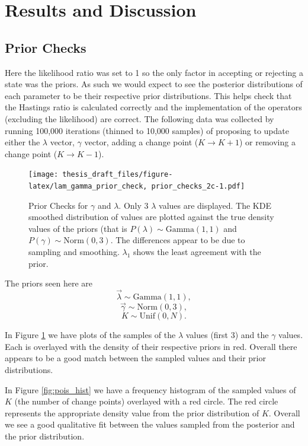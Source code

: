 \documentclass[11pt,a4paper]{article}
\begin{document}
\hypertarget{results-and-discussion}{%
\section{Results and Discussion}\label{results-and-discussion}}

\hypertarget{prior-checks-1}{%
\subsection{Prior Checks}\label{prior-checks-1}}

Here the likelihood ratio was set to 1 so the only factor in accepting
or rejecting a state was the priors. As such we would expect to see the
posterior distributions of each parameter to be their respective prior
distributions. This helps check that the Hastings ratio is calculated
correctly and the implementation of the operators (excluding the
likelihood) are correct. The following data was collected by running
100,000 iterations (thinned to 10,000 samples) of proposing to update
either the \(\lambda\) vector, \(\gamma\) vector, adding a change point
(\(K \rightarrow K + 1\)) or removing a change point
(\(K \rightarrow K - 1\)).

\begin{figure}
\centering
\texttt{[image: thesis\_draft\_files/figure-latex/lam\_gamma\_prior\_check, prior\_checks\_2c-1.pdf]}
\caption{\label{fig:pc2c} Prior Checks for \(\gamma\) and \(\lambda\).
Only 3 \(\lambda\) values are displayed. The KDE smoothed distribution
of values are plotted against the true density values of the priors
(that is \(P(\lambda) \sim \text{Gamma}(1,1)\) and
\(P(\gamma) \sim \text{Norm}(0,3)\). The differences appear to be due to
sampling and smoothing. \(\lambda_1\) shows the least agreement with the
prior.}
\end{figure}

The priors seen here are \[\vec\lambda \sim \text{Gamma}(1,1),\]
\[\vec\gamma \sim \text{Norm}(0,3),\] \[K \sim \text{Unif}(0,N).\]

In Figure \ref{fig:pc2c} we have plots of the samples of the \(\lambda\)
values (first 3) and the \(\gamma\) values. Each is overlayed with the
density of their respective priors in red. Overall there appears to be a
good match between the sampled values and their prior distributions.

In Figure \ref{fig:pois_hist} we have a frequency histogram of the
sampled values of \(K\) (the number of change points) overlayed with a
red circle. The red circle represents the appropriate density value from
the prior distribution of \(K\). Overall we see a good qualitative fit
between the values sampled from the posterior and the prior
distribution.
\end{document}
